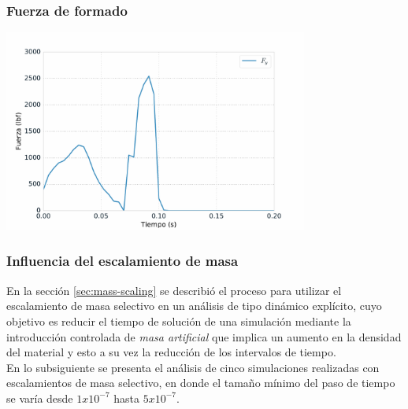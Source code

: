 


\subsubsection{Fuerza de formado}

\begin{center}
\includegraphics[width=0.75\textwidth]{src/ch4/nodal_force_01.pdf}
\label{fig:nodal_force_01}
\end{center}


\subsubsection{Influencia del escalamiento de masa}

En la sección \ref{sec:mass-scaling} se describió el proceso para utilizar el escalamiento de masa 
selectivo en un análisis de tipo dinámico explícito, cuyo objetivo es reducir el tiempo de 
solución de una simulación mediante la introducción controlada de \textit{masa artificial} que implica 
un aumento en la densidad del material y esto a su vez la reducción de los intervalos de tiempo.\\

En lo subsiguiente se presenta el análisis de cinco simulaciones realizadas con escalamientos de 
masa selectivo, en donde el tamaño mínimo del paso de tiempo se varía desde $1x10^{-7}$ hasta 
$5x10^{-7}$.\\

